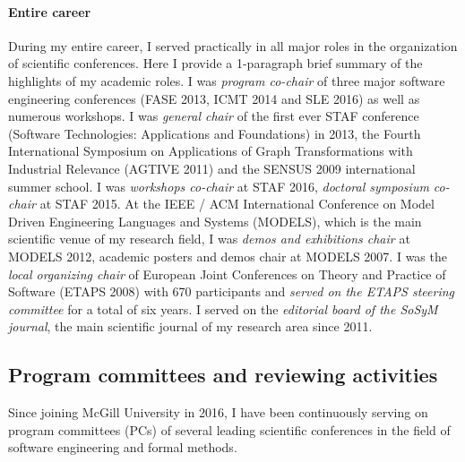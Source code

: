 \paragraph{Entire career}
During my entire career, I served practically in all major roles in the organization of scientific conferences. Here I provide a 1-paragraph brief summary of the highlights of my academic roles. I was \emph{program co-chair} of three major software engineering conferences (FASE 2013, ICMT 2014 and SLE 2016) as well as numerous workshops. I was \emph{general chair} of the first ever STAF conference (Software Technologies: Applications and Foundations) in 2013, the Fourth International Symposium on Applications of Graph Transformations with Industrial Relevance (AGTIVE 2011) and the SENSUS 2009 international summer school. I was \emph{workshops co-chair} at STAF 2016, \emph{doctoral symposium co-chair} at STAF 2015.
At the IEEE / ACM International Conference on Model Driven Engineering Languages and Systems (MODELS), which is the main scientific venue of my research field, I was \emph{demos and exhibitions chair} at MODELS 2012, academic posters and demos chair at MODELS 2007.  I was the \emph{local organizing chair} of European Joint Conferences on Theory and Practice of Software (ETAPS 2008) with 670 participants and \emph{served on the ETAPS steering committee} for a total of six years. 
I served on the \emph{editorial board of the SoSyM journal}, the main scientific journal of my research area since 2011.  

\subsection{Program committees and reviewing activities}
Since joining McGill University in 2016, I have been continuously serving on program committees (PCs) of several leading scientific conferences in the field of software engineering and formal methods. 

